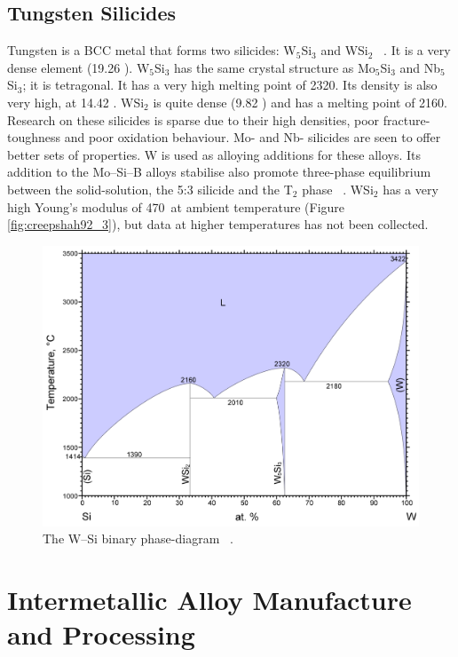  
\subsection{Tungsten Silicides}
Tungsten is a BCC metal that forms two silicides: W$_5$Si$_3$ and WSi$_2$ ~\cite{naidu90w}.  It is a very dense element (19.26 \gram\usk\centi\rpcubic\meter).  W$_5$Si$_3$ has the same crystal structure as Mo$_5$Si$_3$ and Nb$_5$Si$_3$; it is tetragonal. It has a very high melting point of 2320\celsius.  Its density is also very high, at 14.42 \gram\usk\centi\rpcubic\meter.  WSi$_2$ is quite dense (9.82 \gram\usk\centi\rpcubic\meter) and has a melting point of 2160\celsius.  Research on these silicides is sparse due to their high densities, poor fracture-toughness and poor oxidation behaviour.  Mo- and Nb- silicides are seen to offer better sets of properties.  W is used as alloying additions for these alloys.  Its addition to the Mo--Si--B alloys stabilise also promote three-phase equilibrium between the solid-solution, the 5:3 silicide and the T$_2$ phase ~\cite{sakidja08}.  WSi$_2$ has a very high Young's modulus of 470\mega\pascal\ at ambient temperature (Figure \ref{fig:creepshah92_3}), but data at higher temperatures has not been collected.


\begin{figure}[H]
\begin{center}
\includegraphics[width=12cm]{WSi}
\caption{The W--Si binary phase-diagram ~\cite{naidu90w}.}\label{fig:WSi}
\end{center}
\end{figure}


\section{Intermetallic Alloy Manufacture and Processing}

